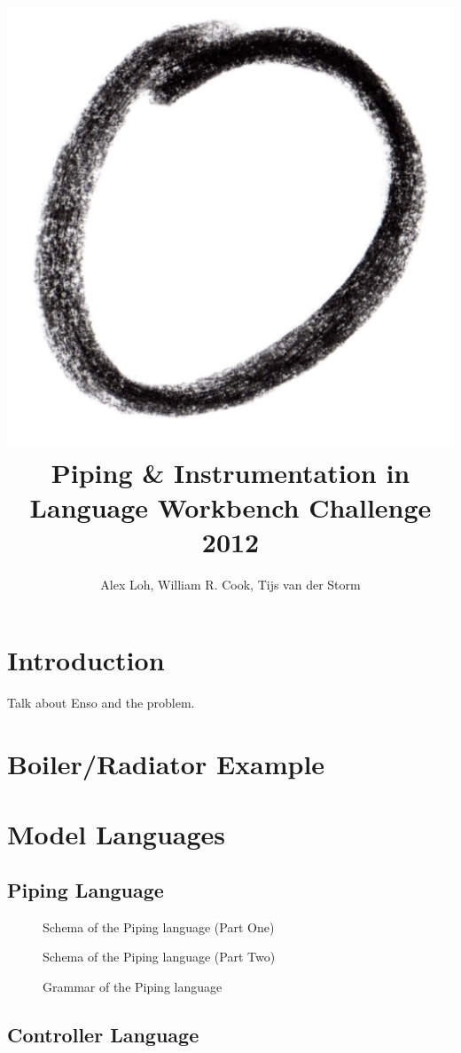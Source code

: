 \documentclass[11pt]{article}
\title{\includegraphics[scale=0.25]{enso.jpg}\\ Piping \& Instrumentation in \Enso \\
   Language Workbench Challenge 2012}
\author{Alex Loh, William R. Cook, Tijs van der Storm}
\begin{document}
\maketitle

\begin{abstract}

\end{abstract}

\section{Introduction}

Talk about Enso and the problem.


\section{Boiler/Radiator Example}

\section{Model Languages}
\subsection{Piping Language}

\begin{figure}
\caption{Schema of the Piping language (Part One)}
\label{piping-grammar}
\end{figure}
\begin{figure}
\caption{Schema of the Piping language (Part Two)}
\label{piping-grammar}
\end{figure}

\begin{figure}
\caption{Grammar of the Piping language}
\label{piping-grammar}
\end{figure}

\subsection{Controller Language}
\end{document}
